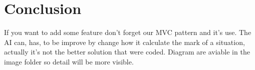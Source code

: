 \chapter{Conclusion}

If you want to add some feature don't forget our MVC pattern and it's use. The AI can, has, to be improve by change how it calculate the mark of a situation, actually it's not the better solution that were coded. Diagram are aviable in the image folder so detail will be more visible.